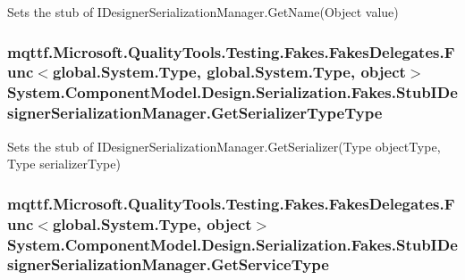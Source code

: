 Sets the stub of I\-Designer\-Serialization\-Manager.\-Get\-Name(\-Object value)

\hypertarget{class_system_1_1_component_model_1_1_design_1_1_serialization_1_1_fakes_1_1_stub_i_designer_serialization_manager_a0b94c5343d762d10306b00f705519248}{
\subsubsection[{Get\-Serializer\-Type\-Type}]{\setlength{\rightskip}{0pt plus 5cm}mqttf.\-Microsoft.\-Quality\-Tools.\-Testing.\-Fakes.\-Fakes\-Delegates.\-Func$<$global.\-System.\-Type, global.\-System.\-Type, object$>$ System.\-Component\-Model.\-Design.\-Serialization.\-Fakes.\-Stub\-I\-Designer\-Serialization\-Manager.\-Get\-Serializer\-Type\-Type}}\label{class_system_1_1_component_model_1_1_design_1_1_serialization_1_1_fakes_1_1_stub_i_designer_serialization_manager_a0b94c5343d762d10306b00f705519248}


Sets the stub of I\-Designer\-Serialization\-Manager.\-Get\-Serializer(\-Type object\-Type, Type serializer\-Type)

\hypertarget{class_system_1_1_component_model_1_1_design_1_1_serialization_1_1_fakes_1_1_stub_i_designer_serialization_manager_a57ea1a52a0a5725bdc59bd7d321c5563}{
\subsubsection[{Get\-Service\-Type}]{\setlength{\rightskip}{0pt plus 5cm}mqttf.\-Microsoft.\-Quality\-Tools.\-Testing.\-Fakes.\-Fakes\-Delegates.\-Func$<$global.\-System.\-Type, object$>$ System.\-Component\-Model.\-Design.\-Serialization.\-Fakes.\-Stub\-I\-Designer\-Serialization\-Manager.\-Get\-Service\-Type}}\label{class_system_1_1_component_model_1_1_design_1_1_serialization_1_1_fakes_1_1_stub_i_designer_serialization_manager_a57ea1a52a0a5725bdc59bd7d321c5563}


